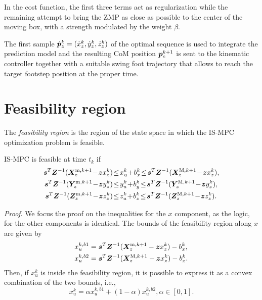 In the cost function, the first three terms act as regularization while the remaining attempt to bring the ZMP as close as possible to the center of the moving box, with a strength modulated by the weight $\beta$.

The first sample $\dot {{\bm{p}}}_z^k = (\dot x_z^k, \dot y_z^k, \dot z_z^k)$ of the optimal sequence is used to integrate the prediction model and the resulting CoM position ${\bm{p}}_c^{k+1}$ is sent to the kinematic controller together with a suitable swing foot trajectory that allows to reach the target footstep position at the proper time.

\section{Feasibility region}

The {\em feasibility region} is the region of the state space in which the IS-MPC optimization problem is feasible.

\begin{proposition}
\label{prop:feasibility}
IS-MPC is feasible at time $t_k$ if
\begin{align}
\label{eq:FAPA:mpc-feasibility-constraint}
\bm{s}^T \bm{Z}^{-1} (\bm{X}_z^{{\rm m}, k+1} \!-\! \bm{z} x_z^k)  \!&\le\! x_u^k \!+\! b_x^k \!\le\! \bm{s}^T \bm{Z}^{-1} (\bm{X}_z^{{\rm M}, k+1} \!-\! \bm{z} x_z^k),
\nonumber\\
\bm{s}^T \bm{Z}^{-1} (\bm{Y}_z^{{\rm m}, k+1} \!-\! \bm{z} y_z^k)  \!&\le\! y_u^k \!+\! b_y^k \!\le\! \bm{s}^T \bm{Z}^{-1} (\bm{Y}_z^{{\rm M}, k+1} \!-\! \bm{z} y_z^k),
\nonumber\\
\bm{s}^T \bm{Z}^{-1} (\bm{Z}_z^{{\rm m}, k+1} \!-\! \bm{z} z_z^k)  \!&\le\! z_u^k \!+\! b_z^k \!\le\! \bm{s}^T \bm{Z}^{-1} (\bm{Z}_z^{{\rm M}, k+1} \!-\! \bm{z} z_z^k).
\end{align}
\end{proposition}
{\em Proof}.
We focus the proof on the inequalities for the $x$ component, as the logic, for the other components is identical. The bounds of the feasibility region along $x$ are given by
\begin{align*}
x_u^{k,b1} &= \bm{s}^T \bm{Z}^{-1} (\bm{X}_z^{{\rm m}, k+1} - \bm{z} x_z^k) - b_x^k, \\
x_u^{k,b2} &= \bm{s}^T \bm{Z}^{-1} (\bm{X}_z^{{\rm M}, k+1} - \bm{z} x_z^k) - b_x^k.
\end{align*}
Then, if $x_u^k$ is inside the feasibility region, it is possible to express it as a convex combination of the two bounds, i.e.,
\begin{equation}\label{eq:FAPA:xu_convex}
x_u^k = \alpha x_u^{k,b1} + (1-\alpha)x_u^{k,b2}, \alpha \in [0, 1].
\end{equation}

